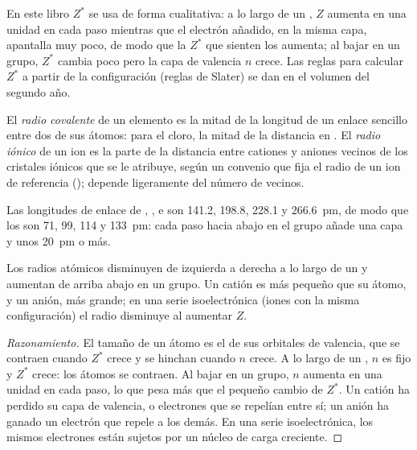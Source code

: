 \begin{remark}\label{rem:b1:periodicity:slater}
En este libro $Z^{*}$ se usa de forma cualitativa: a lo largo de un
, $Z$ aumenta en una unidad en cada paso mientras que el electrón
añadido, en la misma capa, apantalla muy poco, de modo que la $Z^{*}$ que
sienten los  aumenta; al bajar en un grupo, $Z^{*}$
cambia poco pero la capa de valencia $n$ crece. Las reglas para calcular
$Z^{*}$ a partir de la configuración (reglas de Slater) se dan en el
volumen del segundo año.
\end{remark}

\begin{definition}\label{def:b1:periodicity:radius}
El \emph{radio covalente} de un elemento es la
mitad de la longitud de un enlace sencillo entre dos de sus átomos: para
el cloro, la mitad de la distancia  en . El \emph{radio
iónico} de un ion es la parte de la distancia
entre cationes y aniones vecinos de los cristales iónicos que se le
atribuye, según un convenio que fija el radio de un ion de referencia
(); depende ligeramente del número de vecinos.
\end{definition}

\begin{example}\label{ex:b1:periodicity:halogen-radii}
Las longitudes de enlace de , ,  e  son
141.2, 198.8, 228.1 y \qty{266.6}{pm}, de modo que los 
son 71, 99, 114 y \qty{133}{pm}: cada paso hacia abajo en el grupo añade
una capa y unos \qty{20}{pm} o más.
\end{example}

\begin{proposition}\label{prop:b1:periodicity:radius-trend}
Los radios atómicos disminuyen de izquierda a derecha a lo largo de un
 y aumentan de arriba abajo en un grupo. Un catión es más pequeño
que su átomo, y un anión, más grande; en una serie isoelectrónica (iones
con la misma configuración) el radio disminuye al aumentar $Z$.
\end{proposition}

\begin{proof}[Razonamiento]
El tamaño de un átomo es el de sus orbitales de valencia, que se contraen
cuando $Z^{*}$ crece y se hinchan cuando $n$ crece. A lo largo de un
, $n$ es fijo y $Z^{*}$ crece: los átomos se contraen. Al bajar en
un grupo, $n$ aumenta en una unidad en cada paso, lo que pesa más que el
pequeño cambio de $Z^{*}$. Un catión ha perdido su capa de valencia, o
electrones que se repelían entre sí; un anión ha ganado un electrón que
repele a los demás. En una serie isoelectrónica, los mismos electrones
están sujetos por un núcleo de carga creciente.
\end{proof}

